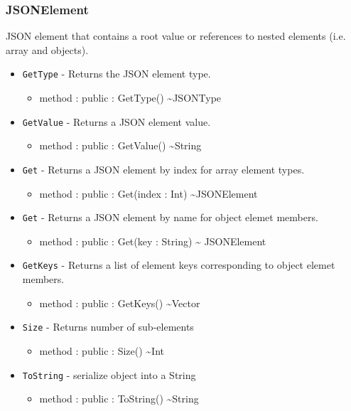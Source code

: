 \documentclass[11pt]{article}
\begin{document}
\subsubsection{JSONElement}
JSON element that contains a root value or references to nested
elements (i.e. array and objects).
\begin{itemize}
\item \texttt{GetType} - Returns the JSON element type.
  \begin{itemize}
  \item method : public : GetType() \textasciitilde JSONType
  \end{itemize}
\item \texttt{GetValue} - Returns a JSON element value.
  \begin{itemize}
  \item method : public : GetValue() \textasciitilde String
  \end{itemize}
\item \texttt{Get} - Returns a JSON element by index for array element
  types.
  \begin{itemize}
  \item method : public : Get(index : Int) \textasciitilde JSONElement
  \end{itemize}
\item \texttt{Get} - Returns a JSON element by name for object elemet
  members.
  \begin{itemize}
  \item method : public : Get(key : String) \textasciitilde
    JSONElement
  \end{itemize}
\item \texttt{GetKeys} - Returns a list of element keys corresponding
  to object elemet members.
  \begin{itemize}
  \item method : public : GetKeys() \textasciitilde Vector
  \end{itemize}
\item \texttt{Size} - Returns number of sub-elements
  \begin{itemize}
  \item method : public : Size() \textasciitilde Int
  \end{itemize}
\item \texttt{ToString} - serialize object into a String
  \begin{itemize}
  \item method : public : ToString() \textasciitilde String
  \end{itemize}
\end{itemize}
\end{document}
